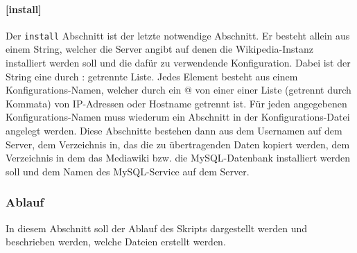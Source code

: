\paragraph{[install]}

Der \texttt{install} Abschnitt ist der letzte notwendige Abschnitt. Er besteht allein aus einem String, welcher die Server angibt auf denen die Wikipedia-Instanz installiert werden soll und die dafür zu verwendende Konfiguration. Dabei ist der String eine durch \glqq{}:\grqq{} getrennte Liste. Jedes Element besteht aus einem Konfigurations-Namen, welcher durch ein \glqq{}@\grqq{} von einer einer Liste (getrennt durch Kommata) von IP-Adressen oder Hostname getrennt ist. Für jeden angegebenen Konfigurations-Namen muss wiederum ein Abschnitt in der Konfigurations-Datei angelegt werden. Diese Abschnitte bestehen dann aus dem Usernamen auf dem Server, dem Verzeichnis in, das die zu übertragenden Daten kopiert werden, dem Verzeichnis in dem das Mediawiki bzw. die MySQL-Datenbank installiert werden soll und dem Namen des MySQL-Service auf dem Server.

\subsubsection{Ablauf}
\label{sec:ablauf}
In diesem Abschnitt soll der Ablauf des Skripts dargestellt werden und beschrieben werden, welche Dateien erstellt werden.

